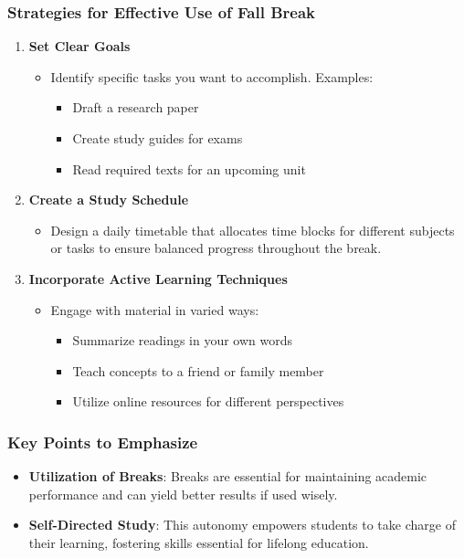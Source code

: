 \documentclass[aspectratio=169]{beamer}
\begin{document}
\begin{frame}[fragile]
    \frametitle{Strategies for Effective Use of Fall Break}
    \begin{enumerate}
        \item \textbf{Set Clear Goals}
            \begin{itemize}
                \item Identify specific tasks you want to accomplish. Examples:
                    \begin{itemize}
                        \item Draft a research paper
                        \item Create study guides for exams
                        \item Read required texts for an upcoming unit
                    \end{itemize}
            \end{itemize}

        \item \textbf{Create a Study Schedule}
            \begin{itemize}
                \item Design a daily timetable that allocates time blocks for different subjects or tasks to ensure balanced progress throughout the break.
            \end{itemize}

        \item \textbf{Incorporate Active Learning Techniques}
            \begin{itemize}
                \item Engage with material in varied ways:
                    \begin{itemize}
                        \item Summarize readings in your own words
                        \item Teach concepts to a friend or family member
                        \item Utilize online resources for different perspectives
                    \end{itemize}
            \end{itemize}
    \end{enumerate}
\end{frame}

\begin{frame}[fragile]
    \frametitle{Key Points to Emphasize}
    \begin{itemize}
        \item \textbf{Utilization of Breaks}: Breaks are essential for maintaining academic performance and can yield better results if used wisely.
        \item \textbf{Self-Directed Study}: This autonomy empowers students to take charge of their learning, fostering skills essential for lifelong education.
    \end{itemize}
\end{frame}
\end{document}
